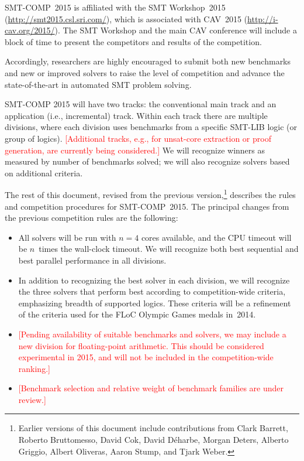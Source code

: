 \documentclass[12pt]{article}
\newcommand{\remark}[1]{{\small\textcolor{red}{[#1]}}}
\begin{document}
SMT-COMP~2015 is affiliated with the SMT Workshop~2015
(\url{http://smt2015.csl.sri.com/}), which is associated with CAV~2015
(\url{http://i-cav.org/2015/}).  The SMT Workshop and the main CAV
conference will include a block of time to present the competitors and
results of the competition.

Accordingly, researchers are highly encouraged to submit both new
benchmarks and new or improved solvers to raise the level of
competition and advance the state-of-the-art in automated SMT problem
solving.

SMT-COMP 2015 will have two tracks: the conventional main track and an
application (i.e., incremental) track.  Within each track there are
multiple divisions, where each division uses benchmarks from a
specific SMT-LIB logic (or group of logics). \remark{Additional
  tracks, e.g., for unsat-core extraction or proof generation, are
  currently being considered.}  We will recognize winners as measured
by number of benchmarks solved; we will also recognize solvers based
on additional criteria.

The rest of this document, revised from the previous
version,\footnote{Earlier versions of this document include
  contributions from Clark Barrett, Roberto Bruttomesso, David Cok,
  David D{\'e}harbe, Morgan Deters, Alberto Griggio, Albert Oliveras,
  Aaron Stump, and Tjark Weber.}  describes the rules and competition
procedures for SMT-COMP~2015.  The principal changes from the previous
competition rules are the following:
\begin{itemize}
\item All solvers will be run with $n=4$ cores available, and the CPU
  timeout will be $n$~times the wall-clock timeout.  We will recognize
  both best sequential and best parallel performance in all divisions.
\item In addition to recognizing the best solver in each division, we
  will recognize the three solvers that perform best according to
  competition-wide criteria, emphasizing breadth of supported logics.
  These criteria will be a refinement of the criteria used for the
  FLoC Olympic Games medals in~2014.
\item \remark{Pending availability of suitable benchmarks and solvers,
  we may include a new division for floating-point arithmetic.  This
  should be considered experimental in 2015, and will not be included
  in the competition-wide ranking.}
\item \remark{Benchmark selection and relative weight of benchmark
  families are under review.}
\end{itemize}
\end{document}
